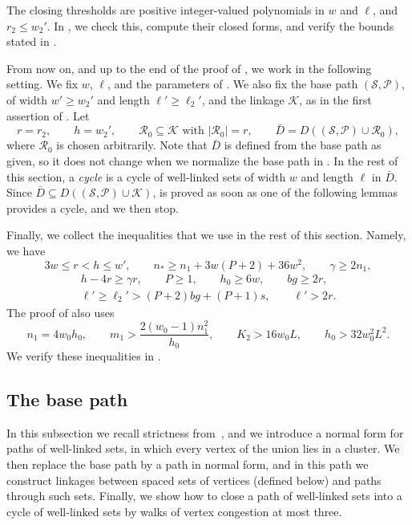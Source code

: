\documentclass[fontsize=12pt,leading=14pt]{fullpaper}
\newcommand{\Kcal}{\mathcal{K}}
\newcommand{\Pcal}{\mathcal{P}}
\newcommand{\Rcal}{\mathcal{R}}
\newcommand{\Scal}{\mathcal{S}}
\begin{document}
The closing thresholds are positive integer-valued polynomials in $w$ and $\ell$, and $r_2\le w_2'$.
In , we check this, compute their closed forms, and verify the bounds stated in .

From now on, and up to the end of the proof of , we work in the following setting.
We fix $w$, $\ell$, and the parameters of .
We also fix the base path $(\Scal,\Pcal)$, of width $w'\ge w_2'$ and length $\ell'\ge\ell_2'$, and the linkage $\Kcal$, as in the first assertion of .
Let
\[
  r=r_2,\qquad h=w_2',\qquad\Rcal_0\subseteq\Kcal\text{ with }|\Rcal_0|=r,\qquad\bar D=D((\Scal,\Pcal)\cup\Rcal_0),
\]
where $\Rcal_0$ is chosen arbitrarily.
Note that $\bar D$ is defined from the base path as given, so it does not change when we normalize the base path in .
In the rest of this section, a \emph{cycle} is a cycle of well-linked sets of width $w$ and length $\ell$ in $\bar D$.
Since $\bar D\subseteq D((\Scal,\Pcal)\cup\Kcal)$,  is proved as soon as one of the following lemmas provides a cycle, and we then stop.

Finally, we collect the inequalities that we use in the rest of this section.
Namely, we have
\begin{equation}\label{eq:stage2-reserves}
  3w\le r<h\le w',\qquad n_*\ge n_1+3w(P+2)+36w^2,\qquad\gamma\ge2n_1,
\end{equation}
\begin{equation}\label{eq:stage2-more}
  \begin{gathered}
    h-4r\ge\gamma r,\qquad P\ge1,\qquad h_0\ge6w,\qquad bg\ge2r,\\
    \ell'\ge\ell_2'>(P+2)bg+(P+1)s,\qquad\ell'>2r.
  \end{gathered}
\end{equation}
The proof of  also uses
\begin{equation}\label{eq:stage2-hole-reserves}
  n_1=4w_0h_0,\qquad
  m_1>\frac{2(w_0-1)n_1^2}{h_0},\qquad
  K_2>16w_0L,\qquad h_0>32w_0^2L^2.
\end{equation}
We verify these inequalities in .

\subsection{The base path}\label{sec:stage2-base}

In this subsection we recall strictness from~\cite[Definition~8.1]{HKMM26a}, and we introduce a normal form for paths of well-linked sets, in which every vertex of the union lies in a cluster.
We then replace the base path by a path in normal form, and in this path we construct linkages between spaced sets of vertices (defined below) and paths through such sets.
Finally, we show how to close a path of well-linked sets into a cycle of well-linked sets by walks of vertex congestion at most three.
\end{document}
